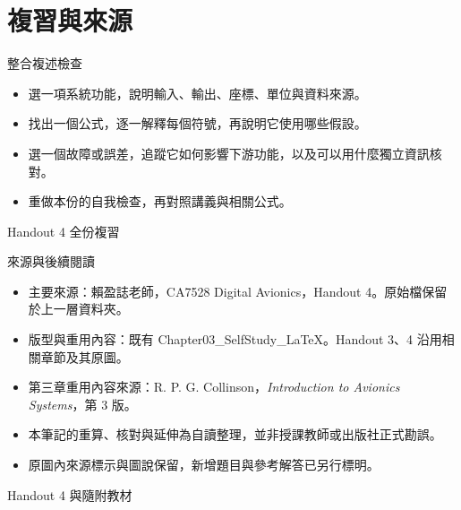 \documentclass[aspectratio=169,11pt]{beamer}
\newcommand{\src}[1]{\par\vfill{\scriptsize\color{teal}#1}}
\newcommand{\slide}[3]{\begin{frame}[t]{#1}#3\src{#2}\end{frame}}
\newcommand{\bi}{\begin{itemize}\setlength{\itemsep}{5pt}}
\newcommand{\ei}{\end{itemize}}
\begin{document}
\section{複習與來源}
\slide{整合複述檢查}{Handout 4 全份複習}{
\bi
\item 選一項系統功能，說明輸入、輸出、座標、單位與資料來源。
\item 找出一個公式，逐一解釋每個符號，再說明它使用哪些假設。
\item 選一個故障或誤差，追蹤它如何影響下游功能，以及可以用什麼獨立資訊核對。
\item 重做本份的自我檢查，再對照講義與相關公式。
\ei
}
\slide{來源與後續閱讀}{Handout 4 與隨附教材}{
\small
\bi
\item 主要來源：賴盈誌老師，CA7528 Digital Avionics，Handout 4。原始檔保留於上一層資料夾。
\item 版型與重用內容：既有 Chapter03\_SelfStudy\_LaTeX。Handout 3、4 沿用相關章節及其原圖。
\item 第三章重用內容來源：R. P. G. Collinson，\textit{Introduction to Avionics Systems}，第 3 版。
\item 本筆記的重算、核對與延伸為自讀整理，並非授課教師或出版社正式勘誤。
\item 原圖內來源標示與圖說保留，新增題目與參考解答已另行標明。
\ei
}
\end{document}
